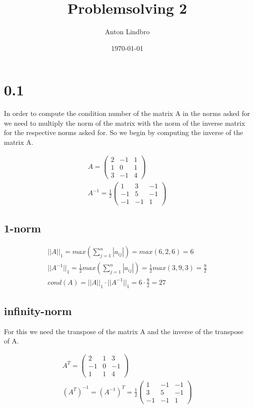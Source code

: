 \documentclass[a4paper]{article}
\title{Problemsolving 2}
\author{Anton Lindbro}
\date{\today}
\begin{document}
\maketitle

\section*{0.1}

In order to compute the condition number of the matrix A in the norms asked for we need to multiply the norm of the matrix with the norm of the inverse matrix for the respective norms asked for. So we begin by computing the inverse of the matrix A.

\begin{align*}
    A = \begin{pmatrix}
        2 & -1 & 1 \\
        1 & 0 & 1 \\
        3 & -1 & 4
    \end{pmatrix}\\
    A^{-1} = \frac{1}{2} \begin{pmatrix}
        1 & 3 & -1\\
        -1 & 5 & -1\\
        -1 & -1 & 1
    \end{pmatrix}
\end{align*}

\subsection*{1-norm}
\begin{align*}
    ||A||_1 = max(\sum_{j=1}^{n} |a_{ij}|) = max(6, 2, 6) = 6\\
    ||A^{-1}||_1 = \frac{1}{2}max(\sum_{j=1}^{n} |a_{ij}|) = \frac{1}{2}max(3, 9, 3) = \frac{9}{2}\\
    cond(A) = ||A||_1 \cdot ||A^{-1}||_1 = 6 \cdot \frac{9}{2} = 27
\end{align*}

\subsection*{infinity-norm}
For this we need the transpose of the matrix A and the inverse of the transpose of A.

\begin{align*}
    A^T = \begin{pmatrix}
        2 & 1 & 3\\
        -1 & 0 & -1\\
        1 & 1 & 4
        \end{pmatrix}\\
    (A^T)^{-1} = (A^{-1})^T = \frac{1}{2} \begin{pmatrix}
        1 & -1 & -1\\
        3 & 5 & -1\\
        -1 & -1 & 1
        \end{pmatrix}
\end{align*}
\end{document}

